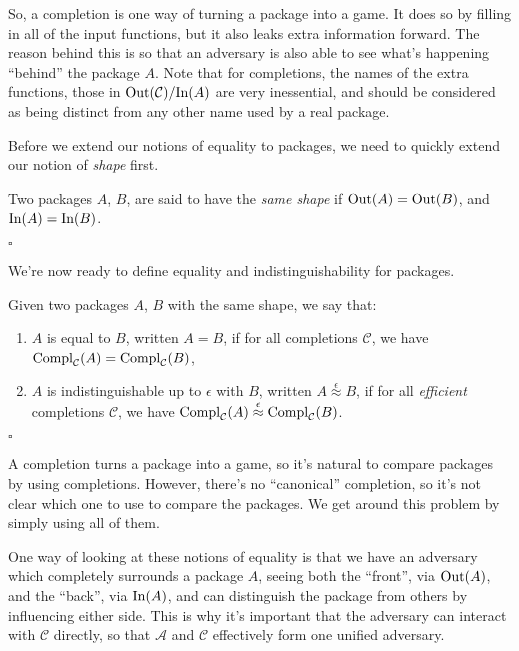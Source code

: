 So, a completion is one way of turning a package into a game.
It does so by filling in all of the input functions,
but it also leaks extra information forward.
The reason behind this is so that an adversary is also able
to see what's happening ``behind'' the package $A$.
Note that for completions, the names of the extra
functions, those in $\text{Out}(\mathcal{C}) / \text{In}(A)$
are very inessential, and should be considered
as being distinct from any other name used by a real package.

Before we extend our notions of equality to packages, we need
to quickly extend our notion of \emph{shape} first.

\begin{definition}
    Two packages $A$, $B$, are said to have the \emph{same shape}
    if $\text{Out}(A) = \text{Out}(B)$, and $\text{In}(A) = \text{In}(B)$.

    $\square$
\end{definition}

We're now ready to define equality and indistinguishability for packages.

\begin{definition}
    Given two packages $A$, $B$ with the same shape, we say that:
    \begin{enumerate}
        \item $A$ is equal to $B$, written $A = B$, if for all completions
        $\mathcal{C}$, we have $\text{Compl}_{\mathcal{C}}(A) = \text{Compl}_{\mathcal{C}}(B)$,
        \item $A$ is indistinguishable up to $\epsilon$ with $B$, written $A \overset{\epsilon}{\approx} B$,
        if for all \emph{efficient} completions $\mathcal{C}$, we have $\text{Compl}_{\mathcal{C}}(A) \overset{\epsilon}{\approx} \text{Compl}_{\mathcal{C}}(B)$.
    \end{enumerate}

    $\square$
\end{definition}

A completion turns a package into a game, so it's natural to compare
packages by using completions.
However, there's no ``canonical'' completion, so it's not clear
which one to use to compare the packages.
We get around this problem by simply using all of them.

One way of looking at these notions of equality is that we
have an adversary which completely surrounds a package $A$,
seeing both the ``front'', via $\text{Out}(A)$, and the ``back'',
via $\text{In}(A)$, and can distinguish the package from others by influencing
either side.
This is why it's important that the adversary can interact with $\mathcal{C}$
directly, so that $\mathcal{A}$ and $\mathcal{C}$ effectively form
one unified adversary.

